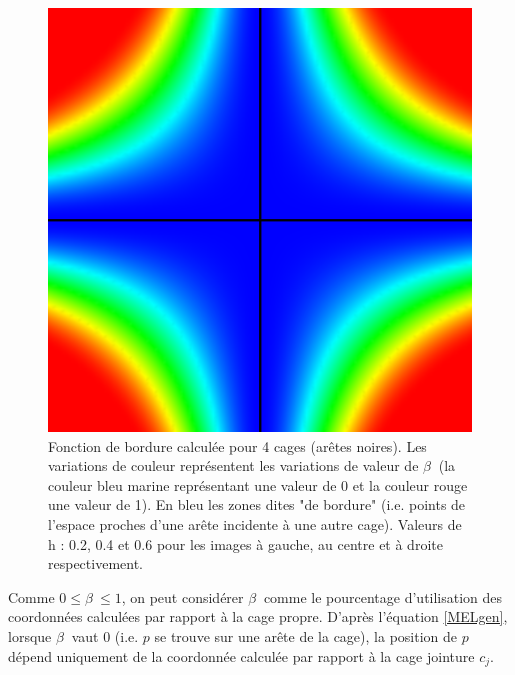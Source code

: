 \begin{figure}
\begin{center}
    \includegraphics[scale=0.35]{starCage-0-6}
    \caption{Fonction de bordure calculée pour 4 cages (arêtes
      noires). Les variations de couleur représentent les variations
      de valeur de $\beta~$ (la couleur bleu marine représentant une
      valeur de 0 et la couleur rouge une valeur de 1). En bleu les
      zones dites "de bordure" (i.e. points de l'espace proches d'une
      arête incidente à une autre cage). Valeurs de h : 0.2, 0.4 et
      0.6 pour les images à gauche, au centre et à droite
      respectivement.}
    \label{MELpar}
  \end{center}
\end{figure}

Comme $0 \leq \beta~ \leq 1$, on peut considérer $\beta~$ comme le
pourcentage d'utilisation des coordonnées calculées par rapport à la
cage propre. D'après l'équation \ref{MELgen}, lorsque $\beta~$ vaut 0
(i.e. $p$ se trouve sur une arête de la cage), la position de $p$
dépend uniquement de la coordonnée calculée par rapport à la cage
jointure $c_j$.


